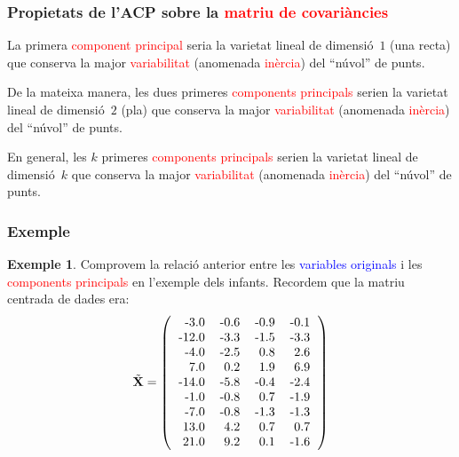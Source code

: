 \documentclass[12pt,t]{beamer}
\newcommand{\red}[1]{\textcolor{red}{#1}}
\newcommand{\blue}[1]{\textcolor{blue}{#1}}
\theoremstyle{plain}
\theoremstyle{definition}
\newtheorem{exemple}{Exemple}
\begin{document}
\begin{frame}
\frametitle{Propietats de l'ACP sobre la \red{matriu de covariàncies}}
La primera \red{component principal} seria la varietat lineal de dimensió~$1$ (una recta) que conserva la major 
\red{variabilitat} (anomenada \red{inèrcia}) del ``núvol'' de punts.
\medskip

De la mateixa manera, les dues primeres \red{components principals} serien la varietat lineal de dimensió~$2$ (pla) que 
conserva la major \red{variabilitat} (anomenada \red{inèrcia}) del ``núvol'' de punts.
\medskip

En general, les $k$ primeres \red{components principals} serien la varietat lineal de dimensió~$k$ que conserva la major 
\red{variabilitat} (anomenada \red{inèrcia}) del ``núvol'' de punts.


\end{frame}


\begin{frame}
\frametitle{Exemple}
\begin{exemple}
Comprovem la relació anterior entre les \blue{variables originals} i les \red{components principals} en l'exemple dels 
infants.
Recordem que la matriu centrada de dades era:
\[
\tilde{\mathbf{X}}=\left(
\begin{tabular}{rrrr}
  -3.0 & -0.6 & -0.9 & -0.1 \\ 
  -12.0 & -3.3 & -1.5 & -3.3 \\ 
  -4.0 & -2.5 & 0.8 & 2.6 \\ 
  7.0 & 0.2 & 1.9 & 6.9 \\ 
  -14.0 & -5.8 & -0.4 & -2.4 \\ 
  -1.0 & -0.8 & 0.7 & -1.9 \\ 
  -7.0 & -0.8 & -1.3 & -1.3 \\ 
  13.0 & 4.2 & 0.7 & 0.7 \\ 
  21.0 & 9.2 & 0.1 & -1.6 \\ 
  \end{tabular}\right)
\]
\end{exemple}
\end{frame}
\end{document}
